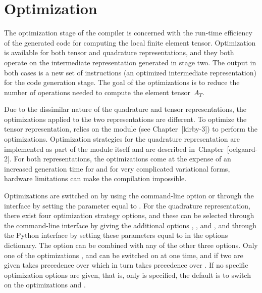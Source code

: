 \section{Optimization}

The optimization stage of the \ffc{} compiler is concerned with the
run-time efficiency of the generated code for computing the local finite
element tensor. Optimization is available for both tensor and
quadrature representations, and they both operate on the intermediate
representation generated in stage two. The output in both cases is a
new set of instructions (an optimized intermediate representation) for
the code generation stage. The goal of the optimizations is
to reduce the number of operations needed to compute the element
tensor~$A_T$.

Due to the dissimilar nature of the quadrature and tensor representations,
the optimizations applied to the two representations are different.
To optimize the tensor representation,
\ffc{} relies on the \pythonlang{} module \ferari{} (see Chapter~[kirby-3])
to perform the optimizations. Optimization strategies for the quadrature
representation are implemented as part of the
\ffc{} module itself and are described in~Chapter~[oelgaard-2].
For both representations, the optimizations come at the expense of an
increased generation time for \ffc{} and for very complicated
variational forms, hardware limitations can make the compilation
impossible.

Optimizations are switched on by using the command-line
option  or through the \pythonlang{} interface by setting the
parameter  equal to . For the quadrature
representation, there exist four optimization strategy options,
and these can be selected through the command-line interface by giving
the additional options , ,
 and ,
and through the Python interface by setting these
parameters equal to  in the options dictionary.
The option  can be combined with
any of the other three options.
Only one of the optimizations ,
 and  can be
switched on at one time, and if two are given 
takes precedence over  which in turn takes
precedence over .
If no specific optimization options are given, that is,
only  is specified, the default is to switch on the
optimizations  and
.

